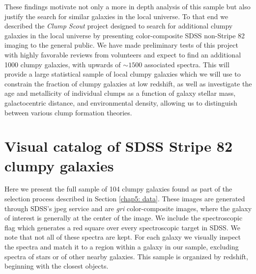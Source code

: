 These findings motivate not only a more in depth analysis of this sample but also justify the search for similar galaxies in the local universe. To that end we described the \textit{Clump Scout} project designed to search for additional clumpy galaxies in the local universe by presenting color-composite SDSS non-Stripe 82 imaging to the general public. We have made preliminary tests of this project with highly favorable reviews from volunteers and expect to find an additional 1000 clumpy galaxies, with upwards of $\sim1500$ associated spectra. This will provide a large statistical sample of local clumpy galaxies which we will use to constrain the fraction of clumpy galaxies at low redshift, as well as investigate the age and metallicity of individual clumps as a function of galaxy stellar mass, galactocentric distance, and environmental density, allowing us to distinguish between various clump formation theories.  


\section{Visual catalog of SDSS Stripe 82 clumpy galaxies}
\label{chap5: jpegs}

Here we present the full sample of 104 clumpy galaxies found as part of the selection process described in Section \ref{chap5: data}. These images are generated through SDSS's jpeg service and are \textit{gri} color-composite images, where the galaxy of interest is generally at the center of the image. We include the spectroscopic flag which generates a red square over every spectroscopic target in SDSS. We note that not all of these spectra are kept. For each galaxy we visually inspect the spectra and match it to a region within a galaxy in our sample, excluding spectra of stars or of other nearby galaxies. This sample is organized by redshift, beginning with the closest objects. 


